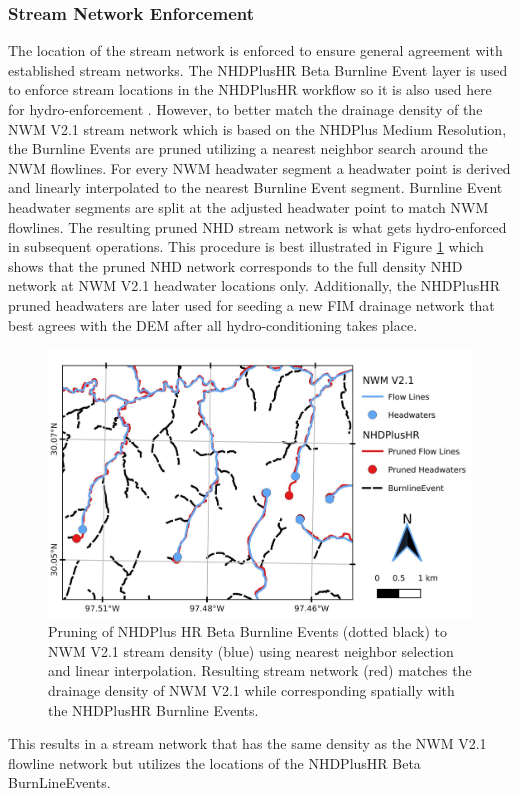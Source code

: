 \subsubsection{Stream Network Enforcement} 
\label{ssec:stream_network_enforcment}
%
The location of the stream network is enforced to ensure general agreement with established stream networks.
The NHDPlusHR Beta Burnline Event layer is used to enforce stream locations in the NHDPlusHR workflow so it is also used here for hydro-enforcement \cite{moore2019user}. 
However, to better match the drainage density of the NWM V2.1 stream network which is based on the NHDPlus Medium Resolution, the Burnline Events are pruned utilizing a nearest neighbor search around the NWM flowlines.
For every NWM headwater segment a headwater point is derived and linearly interpolated to the nearest Burnline Event segment.
Burnline Event headwater segments are split at the adjusted headwater point to match NWM flowlines.
The resulting pruned NHD stream network is what gets hydro-enforced in subsequent operations.
This procedure is best illustrated in Figure \ref{fig:stream_density_pruning} which shows that the pruned NHD network corresponds to the full density NHD network at NWM V2.1 headwater locations only. 
Additionally, the NHDPlusHR pruned headwaters are later used for seeding a new FIM drainage network that best agrees with the DEM after all hydro-conditioning takes place.
%
\begin{figure}[h!]
\centering
\includegraphics[scale=1.0]{figures/headwaters.jpg}
\caption{Pruning of NHDPlus HR Beta Burnline Events (dotted black) to NWM V2.1 stream density (blue) using nearest neighbor selection and linear interpolation. Resulting stream network (red) matches the drainage density of NWM V2.1 while corresponding spatially with the NHDPlusHR Burnline Events.}
\label{fig:stream_density_pruning}
\end{figure}
%
This results in a stream network that has the same density as the NWM V2.1 flowline network but utilizes the locations of the NHDPlusHR Beta BurnLineEvents. 

